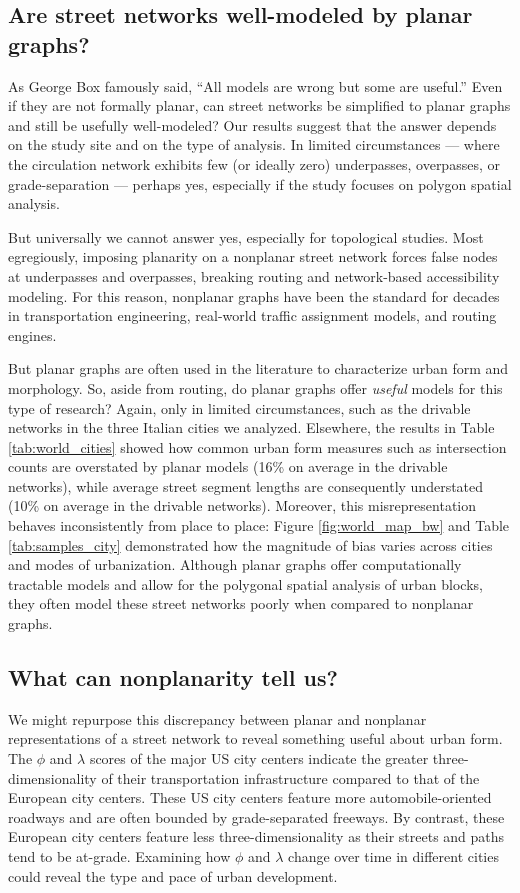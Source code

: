 \documentclass[Afour,sageh,times]{sagej}
\begin{document}
\subsection{Are street networks well-modeled by planar graphs?}

As George Box famously said, \enquote{All models are wrong but some are useful.} Even if they are not formally planar, can street networks be simplified to planar graphs and still be usefully well-modeled? Our results suggest that the answer depends on the study site and on the type of analysis. In limited circumstances --- where the circulation network exhibits few (or ideally zero) underpasses, overpasses, or grade-separation --- perhaps yes, especially if the study focuses on polygon spatial analysis.

But universally we cannot answer yes, especially for topological studies. Most egregiously, imposing planarity on a nonplanar street network forces false nodes at underpasses and overpasses, breaking routing and network-based accessibility modeling. For this reason, nonplanar graphs have been the standard for decades in transportation engineering, real-world traffic assignment models, and routing engines.

But planar graphs are often used in the literature to characterize urban form and morphology. So, aside from routing, do planar graphs offer \emph{useful} models for this type of research? Again, only in limited circumstances, such as the drivable networks in the three Italian cities we analyzed. Elsewhere, the results in Table \ref{tab:world_cities} showed how common urban form measures such as intersection counts are overstated by planar models (16\% on average in the drivable networks), while average street segment lengths are consequently understated (10\% on average in the drivable networks). Moreover, this misrepresentation behaves inconsistently from place to place: Figure \ref{fig:world_map_bw} and Table \ref{tab:samples_city} demonstrated how the magnitude of bias varies across cities and modes of urbanization. Although planar graphs offer computationally tractable models and allow for the polygonal spatial analysis of urban blocks, they often model these street networks poorly when compared to nonplanar graphs.


\subsection{What can nonplanarity tell us?}

We might repurpose this discrepancy between planar and nonplanar representations of a street network to reveal something useful about urban form. The $\phi$ and $\lambda$ scores of the major US city centers indicate the greater three-dimensionality of their transportation infrastructure compared to that of the European city centers. These US city centers feature more automobile-oriented roadways and are often bounded by grade-separated freeways. By contrast, these European city centers feature less three-dimensionality as their streets and paths tend to be at-grade. Examining how $\phi$ and $\lambda$ change over time in different cities could reveal the type and pace of urban development. 
\end{document}
